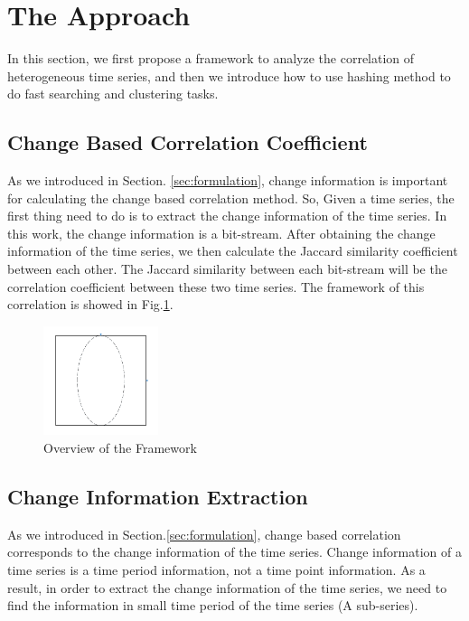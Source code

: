 \section{The Approach}
\label{sec:framework}
In this section, we first propose a framework to analyze the correlation of heterogeneous time series, and then we introduce how to use hashing method to do fast searching and clustering tasks. 

\subsection{Change Based Correlation Coefficient}

As we introduced in Section. \ref{sec:formulation}, change information is important for calculating the change based correlation method. 
So, Given a time series, the first thing need to do is to extract the change information of the time series. In this work, the change information is a bit-stream.
After obtaining the change information of the time series, we then calculate the Jaccard similarity coefficient between each other. The Jaccard similarity between each bit-stream will be the correlation coefficient between these two time series. 
The framework of this correlation is showed in Fig.\ref{FarameworkOverview}.
 
\begin{figure}[t]
\centering
\includegraphics[width=0.3\textwidth]{temp.pdf}
\caption{Overview of the Framework}
\label{FarameworkOverview}
\end{figure}

\subsection{Change Information Extraction}
\label{ChangeCorrelation}

As we introduced in Section.\ref{sec:formulation}, change based correlation corresponds to the change information of the time series. Change information of a time series is a time period information, not a time point information. As a result, in order to extract the change information of the time series, we need to find the information in small time period of the time series (A sub-series). 

